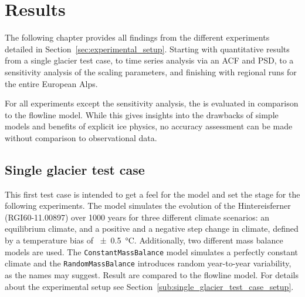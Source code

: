 \chapter{Results}\label{chap:results}
\thispagestyle{plain}

  The following chapter provides all findings from the different experiments detailed in Section~\ref{sec:experimental_setup}. Starting with quantitative results from a single glacier test case, to time series analysis via an ACF and PSD, to a sensitivity analysis of the scaling parameters, and finishing with regional runs for the entire European Alps.

  For all experiments except the sensitivity analysis, the \vas{} is evaluated in comparison to the flowline model. While this gives insights into the drawbacks of simple models and benefits of explicit ice physics, no accuracy assessment can be made without comparison to observational data.

  \section{Single glacier test case} %
  \label{sec:single_glacier_test_case_results}

    This first test case is intended to get a feel for the \vas{} model and set the stage for the following experiments. The model simulates the evolution of the Hintereisferner (RGI60-11.00897) over 1000 years for three different climate scenarios: an equilibrium climate, and a positive and a negative step change in climate, defined by a temperature bias of \SI{\pm0.5}{\celsius}. Additionally, two different mass balance models are used. The \lstinline`ConstantMassBalance` model simulates a perfectly constant climate and the \lstinline`RandomMassBalance` introduces random year-to-year variability, as the names may suggest. Result are compared to the flowline model. For details about the experimental setup see Section~\ref{sub:single_glacier_test_case_setup}.

